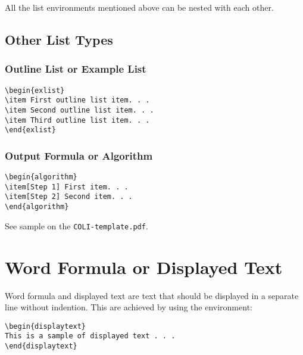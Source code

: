 \documentclass{clv3}
\begin{document}
All the list environments mentioned above can be nested with each other.

\subsection{Other List Types}

\subsubsection{Outline List or Example List}

\begin{verbatim}
\begin{exlist}
\item First outline list item. . .
\item Second outline list item. . .
\item Third outline list item. . .
\end{exlist}
\end{verbatim}

\subsubsection{Output Formula or Algorithm}

\begin{verbatim}
\begin{algorithm}
\item[Step 1] First item. . .
\item[Step 2] Second item. . .
\end{algorithm}
\end{verbatim}


See sample on the {\tt COLI-template.pdf}.

\section{Word Formula or Displayed Text}

Word formula and displayed text are text that should be displayed in a
separate line without indention. This are achieved by using the environment:

\begin{verbatim}
\begin{displaytext}
This is a sample of displayed text . . .
\end{displaytext}
\end{verbatim}
\end{document}
